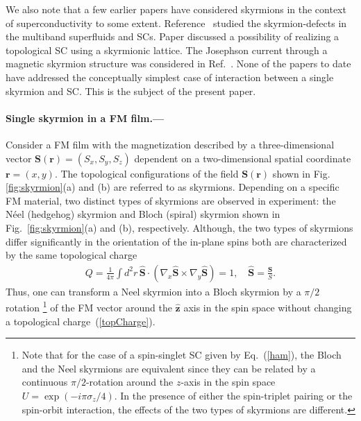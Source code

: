 \documentclass[twocolumn,showpacs,floatfix,longbibliography]{revtex4-1}
\begin{document}
We also note that a few earlier papers have considered skyrmions in the context of superconductivity to some extent. Reference~\cite{Garaud2011} studied the skyrmion-defects in the multiband superfluids and SCs. Paper \cite{Nakosai2013} discussed a possibility of realizing a topological SC using a skyrmionic lattice. The Josephson current through a magnetic skyrmion structure was considered in Ref.~\cite{Yokoyama2015}. None of the papers to date have addressed the conceptually simplest case of interaction between a single skyrmion and SC. This is the subject of the present paper.

\paragraph*{Single skyrmion in a FM film.---} \label{sec:skyrmion}


Consider a FM film with the magnetization described by a three-dimensional vector $\bm S(\bm r) = (S_x,S_y,S_z)$ dependent on a two-dimensional spatial coordinate $\bm r = (x,y)$. The topological configurations of the field $\bm S(\bm r)$ shown in Fig. \ref{fig:skyrmion}(a) and (b) are referred to as skyrmions.  Depending on a specific FM material, two distinct types of skyrmions are observed in experiment: the N\'eel (hedgehog) skyrmion and Bloch (spiral) skyrmion shown in Fig.~\ref{fig:skyrmion}(a) and (b), respectively. Although, the two types of skyrmions differ significantly in the orientation of the in-plane spins both are characterized by the same topological charge
\begin{align}
	Q = \frac{1}{4\pi} \int d^2r \, \hat {\bm S}\cdot (\nabla_x\hat {\bm S}\times\nabla_y\hat {\bm S})=1,\quad  \hat {\bm S}= \frac{\bm S}{S}.
	\label{topCharge}
\end{align}
Thus, one can transform a Neel skyrmion into a Bloch skyrmion by a $\pi/2$ rotation  \footnote{Note that for the case of a spin-singlet SC given by Eq.~(\ref{ham}), the Bloch and the Neel skyrmions are equivalent since they can be related by a continuous $\pi/2$-rotation around the $z$-axis in the spin space $U = \exp(-i\pi\sigma_z/4)$. In the presence of either the spin-triplet pairing or the spin-orbit interaction, the effects of the two types of skyrmions are different.} of the FM vector around the $\hat {\bm z}$ axis in the spin space without changing a topological charge~(\ref{topCharge}). 
\end{document}
